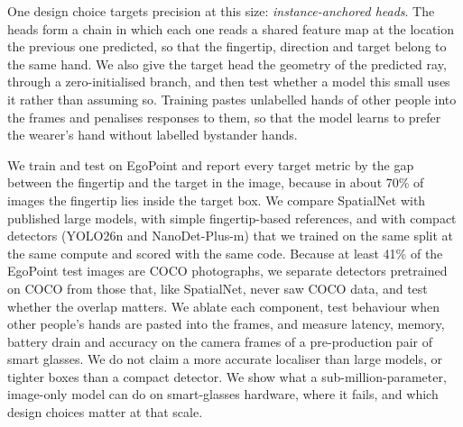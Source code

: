One design choice targets precision at this size: \emph{instance-anchored heads}. The heads form a chain in which each one reads a shared feature map at the location the previous one predicted, so that the fingertip, direction and target belong to the same hand. We also give the target head the geometry of the predicted ray, through a zero-initialised branch, and then test whether a model this small uses it rather than assuming so. Training pastes unlabelled hands of other people into the frames and penalises responses to them, so that the model learns to prefer the wearer's hand without labelled bystander hands.

We train and test on EgoPoint and report every target metric by the gap between the fingertip and the target in the image, because in about 70\% of images the fingertip lies inside the target box. We compare SpatialNet with published large models, with simple fingertip-based references, and with compact detectors (YOLO26n and NanoDet-Plus-m) that we trained on the same split at the same compute and scored with the same code. Because at least 41\% of the EgoPoint test images are COCO photographs, we separate detectors pretrained on COCO from those that, like SpatialNet, never saw COCO data, and test whether the overlap matters. We ablate each component, test behaviour when other people's hands are pasted into the frames, and measure latency, memory, battery drain and accuracy on the camera frames of a pre-production pair of smart glasses. We do not claim a more accurate localiser than large models, or tighter boxes than a compact detector. We show what a sub-million-parameter, image-only model can do on smart-glasses hardware, where it fails, and which design choices matter at that scale.

